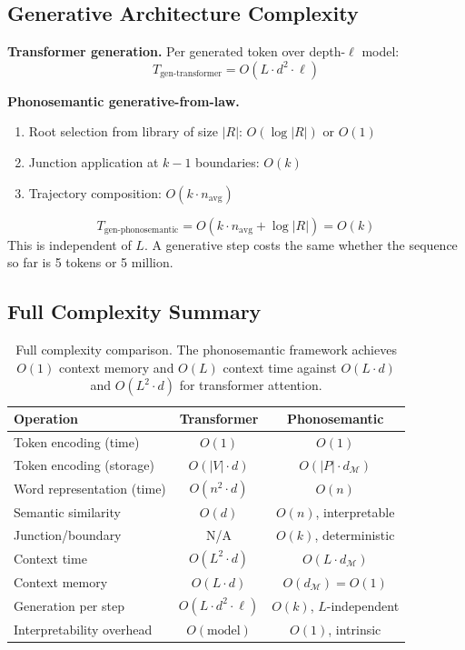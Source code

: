 \documentclass[12pt]{article}
\begin{document}
\subsection{Generative Architecture Complexity}

\textbf{Transformer generation.}
Per generated token over depth-$\ell$ model:
\[
T_\text{gen-transformer} = O(L \cdot d^2 \cdot \ell)
\]

\textbf{Phonosemantic generative-from-law.}
\begin{enumerate}
  \item Root selection from library of size $|R|$: $O(\log |R|)$ or $O(1)$
  \item Junction application at $k-1$ boundaries: $O(k)$
  \item Trajectory composition: $O(k \cdot n_\text{avg})$
\end{enumerate}
\[
T_\text{gen-phonosemantic} = O(k \cdot n_\text{avg} + \log |R|) = O(k)
\]
This is independent of $L$. A generative step costs the same whether the sequence so far is 5 tokens or 5 million.

\subsection{Full Complexity Summary}

\begin{table}[htbp]
\centering
\renewcommand{\arraystretch}{1.35}
\begin{tabular}{lcc}
\toprule
\textbf{Operation} & \textbf{Transformer} & \textbf{Phonosemantic} \\
\midrule
Token encoding (time) & $O(1)$ & $O(1)$ \\
Token encoding (storage) & $O(|V| \cdot d)$ & $O(|P| \cdot d_\mathcal{M})$ \\
Word representation (time) & $O(n^2 \cdot d)$ & $O(n)$ \\
Semantic similarity & $O(d)$ & $O(n)$, interpretable \\
Junction/boundary & N/A & $O(k)$, deterministic \\
Context time & $O(L^2 \cdot d)$ & $O(L \cdot d_\mathcal{M})$ \\
Context memory & $O(L \cdot d)$ & $O(d_\mathcal{M}) = O(1)$ \\
Generation per step & $O(L \cdot d^2 \cdot \ell)$ & $O(k)$, $L$-independent \\
Interpretability overhead & $O(\text{model})$ & $O(1)$, intrinsic \\
\bottomrule
\end{tabular}
\caption{Full complexity comparison. The phonosemantic framework achieves $O(1)$ context memory and $O(L)$ context time against $O(L \cdot d)$ and $O(L^2 \cdot d)$ for transformer attention.}
\end{table}
\end{document}
